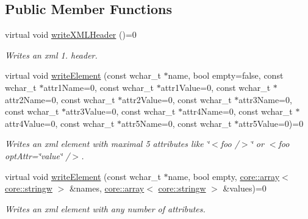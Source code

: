 \subsection*{Public Member Functions}
\begin{DoxyCompactItemize}
\item 
virtual void \hyperlink{classirr_1_1io_1_1IXMLWriter_a66fd00f6528fc967e53ea2a83f4fbf09}{write\+X\+M\+L\+Header} ()=0
\begin{DoxyCompactList}\small\item\em Writes an xml 1. header. \end{DoxyCompactList}\item 
virtual void \hyperlink{classirr_1_1io_1_1IXMLWriter_a09ffde58db20f23b7eba1bf08e1daf42}{write\+Element} (const wchar\+\_\+t $\ast$name, bool empty=false, const wchar\+\_\+t $\ast$attr1\+Name=0, const wchar\+\_\+t $\ast$attr1\+Value=0, const wchar\+\_\+t $\ast$attr2\+Name=0, const wchar\+\_\+t $\ast$attr2\+Value=0, const wchar\+\_\+t $\ast$attr3\+Name=0, const wchar\+\_\+t $\ast$attr3\+Value=0, const wchar\+\_\+t $\ast$attr4\+Name=0, const wchar\+\_\+t $\ast$attr4\+Value=0, const wchar\+\_\+t $\ast$attr5\+Name=0, const wchar\+\_\+t $\ast$attr5\+Value=0)=0
\begin{DoxyCompactList}\small\item\em Writes an xml element with maximal 5 attributes like \char`\"{}$<$foo /$>$\char`\"{} or $<$foo opt\+Attr=\char`\"{}value\char`\"{} /$>$. \end{DoxyCompactList}\item 
\mbox{\label{classirr_1_1io_1_1IXMLWriter_a78bbf9835512bb404c34339c1a34ea31}} 
virtual void \hyperlink{classirr_1_1io_1_1IXMLWriter_a78bbf9835512bb404c34339c1a34ea31}{write\+Element} (const wchar\+\_\+t $\ast$name, bool empty, \hyperlink{classirr_1_1core_1_1array}{core\+::array}$<$ \hyperlink{namespaceirr_1_1core_aef83fafbb1b36fcce44c07c9be23a7f2}{core\+::stringw} $>$ \&names, \hyperlink{classirr_1_1core_1_1array}{core\+::array}$<$ \hyperlink{namespaceirr_1_1core_aef83fafbb1b36fcce44c07c9be23a7f2}{core\+::stringw} $>$ \&values)=0
\begin{DoxyCompactList}\small\item\em Writes an xml element with any number of attributes. \end{DoxyCompactList}\item 
\mbox{\label{classirr_1_1io_1_1IXMLWriter_af6de322540d69764bd33a384763babd1}} 

\end{DoxyCompactItemize}
